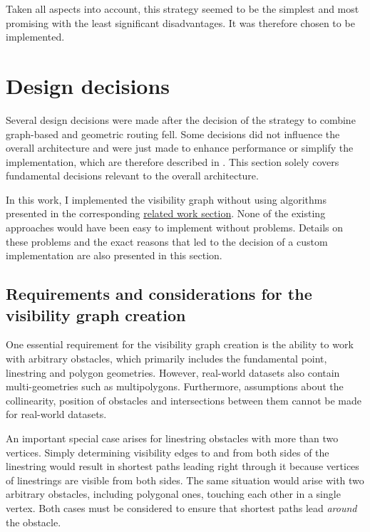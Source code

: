 		Taken all aspects into account, this strategy seemed to be the simplest and most promising with the least significant disadvantages.
		It was therefore chosen to be implemented.

\section{Design decisions}
\label{sec:design-decisions}

	Several design decisions were made after the decision of the strategy to combine graph-based and geometric routing fell.
	Some decisions did not influence the overall architecture and were just made to enhance performance or simplify the implementation, which are therefore described in .
	This section solely covers fundamental decisions relevant to the overall architecture.
	
	In this work, I implemented the visibility graph without using algorithms presented in the corresponding \hyperref[subsec:related-work:visibility-graph]{related work section}.
	None of the existing approaches would have been easy to implement without problems.
	Details on these problems and the exact reasons that led to the decision of a custom implementation are also presented in this section.
	
	\subsection{Requirements and considerations for the visibility graph creation}
	
		One essential requirement for the visibility graph creation is the ability to work with arbitrary obstacles, which primarily includes the fundamental point, linestring and polygon geometries.
		However, real-world datasets also contain multi-geometries such as multipolygons.
		Furthermore, assumptions about the collinearity, position of obstacles and intersections between them cannot be made for real-world datasets.
		
		An important special case arises for linestring obstacles with more than two vertices.
		Simply determining visibility edges to and from both sides of the linestring would result in shortest paths leading right through it because vertices of linestrings are visible from both sides.
		The same situation would arise with two arbitrary obstacles, including polygonal ones, touching each other in a single vertex.
		Both cases must be considered to ensure that shortest paths lead \emph{around} the obstacle.
		
